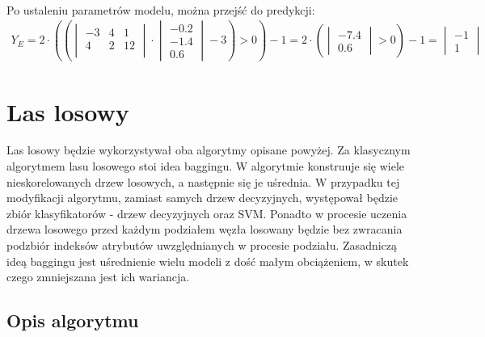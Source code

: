 \documentclass[
    left=2.5cm,         %
    right=2.5cm,        %
    top=2.5cm,          %
    bottom=3cm,         %
    bindingoffset=6mm,  %
    nohyphenation=false %
]{eiti/eiti-report}
\begin{document}
\\
    Po ustaleniu parametrów modelu, można przejść do predykcji:
\begin{gather*}
    Y_E = 2\cdot (
            (\begin{vmatrix}
                -3&4&1\\
                4&2&12\\
            \end{vmatrix}
            \cdot 
            \begin{vmatrix}
                -0.2\\
                -1.4\\
                0.6
            \end{vmatrix} 
            - 3
            ) 
        > 0) -1 = 
        2 \cdot (
        \begin{vmatrix}
                -7.4\\
                0.6
        \end{vmatrix} 
        > 0) - 1 = 
        \begin{vmatrix}
                -1\\
                1
        \end{vmatrix} 
\end{gather*}

\section{Las losowy}
Las losowy będzie wykorzystywał oba algorytmy opisane powyżej. Za klasycznym algorytmem lasu losowego stoi idea baggingu. W algorytmie konstruuje się wiele nieskorelowanych drzew losowych, a następnie się je uśrednia. W przypadku tej modyfikacji algorytmu, zamiast samych drzew decyzyjnych, występował będzie zbiór klasyfikatorów - drzew decyzyjnych oraz SVM. Ponadto w procesie uczenia drzewa losowego przed każdym podziałem węzła losowany będzie bez zwracania podzbiór indeksów atrybutów uwzględnianych w procesie podziału. Zasadniczą ideą baggingu jest uśrednienie wielu modeli z dość małym obciążeniem, w skutek czego zmniejszana jest ich wariancja.

\subsection{Opis algorytmu}
\end{document}
